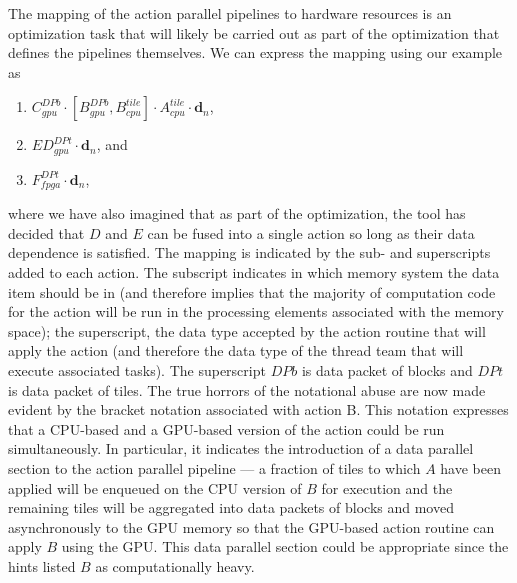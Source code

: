 \documentclass{article}
\begin{document}
The mapping of the action parallel pipelines to hardware resources is an
optimization task that will likely be carried out as part of the optimization
that defines the pipelines themselves.  We can express the mapping using our
example as
\begin{enumerate}
\item{$C_{gpu}^{DPb} \cdot \left[B_{gpu}^{DPb},B_{cpu}^{tile}\right] \cdot
A_{cpu}^{tile}\cdot \mathbf{d}_n$},
\item{$ED_{gpu}^{DPt}\cdot\mathbf{d}_n$}, and
\item{$F_{fpga}^{DPt} \cdot\mathbf{d}_n$},
\end{enumerate}
where we have also imagined that as part of the optimization, the tool has
decided that $D$ and $E$ can be fused into a single action so long as
their data dependence is satisfied.  The mapping is indicated by the sub- and
superscripts added to each action.  The subscript indicates in which memory
system the data item should be in (and therefore implies that the majority of
computation code for the action will be run in the processing elements
associated with the memory space); the superscript, the data type accepted by
the action routine that will apply the action (and therefore the data type of
the thread team that will execute associated tasks).  The superscript $DPb$ is
data packet of blocks and $DPt$ is data packet of tiles.  The true horrors of
the notational abuse are now made evident by the bracket notation associated
with action B.  This notation expresses that a CPU-based and a GPU-based version
of the action could be run simultaneously.  In particular, it indicates the
introduction of a data parallel section to the action parallel pipeline --- a
fraction of tiles to which $A$ have been applied will be enqueued on the CPU
version of $B$ for execution and the remaining tiles will be aggregated into
data packets of blocks and moved asynchronously to the GPU memory so that the
GPU-based action routine can apply $B$ using the GPU.  This data parallel
section could be appropriate since the hints listed $B$ as computationally
heavy.\\
\end{document}
